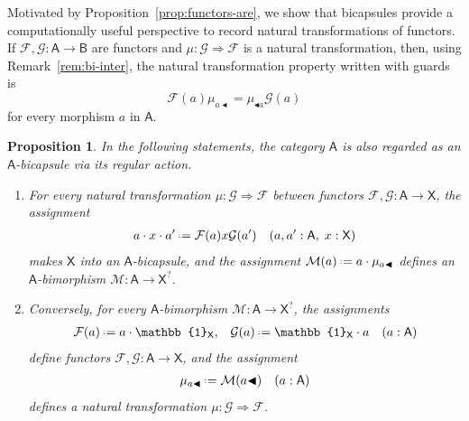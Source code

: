 \documentclass{amsart}
\newcommand{\Cat}[1]{\mathsf{#1}}
\newcommand{\cat}[1]{\Cat{#1}}
\newcommand{\acat}[1]{\mathsf{#1}}
\newcommand{\Caps}[1]{\mathsf{#1}}
\numberwithin{lstfloat}{section}
\newcommand{\srcfunc}{\mathbin{\blacktriangleleft}}
\newcommand{\tgtfunc}{\mathbin{\blacktriangleleft}}
\newcommand{\src}[1]{#1\srcfunc}
\newcommand{\tgt}[1]{\tgtfunc #1}
\newcommand{\one}{\mathbb{1}}
\newcommand{\defeq}{\mathrel{\hstretch{.13}{=}\hspace{.2ex}{=}}}
\newcommand{\func}[1]{\mathcal{#1}}
\newcommand{\fF}{\func{F}}
\newcommand{\fG}{\func{G}}
\newcommand{\fM}{\func{M}}
\newcommand{\cA}{\cat{A}}
\newcommand{\cX}{\cat{X}}
\newcommand{\aA}{\Caps{A}}
\newcommand{\aX}{\Caps{X}}
\newenvironment{ithm}{\begin{enumerate}[label={\rm(\alph*)}, ref=(\alph*),
      labelwidth=18pt, leftmargin=18pt, topsep=3pt, itemsep=1pt, parsep=2pt]}
      {\end{enumerate}}
\newtheorem{prop}[thm]{Proposition}
\theoremstyle{definition}
\theoremstyle{remark}
\numberwithin{equation}{section}
\begin{document}
Motivated by Proposition~\ref{prop:functors-are}, we show that bicapsules
provide a computationally useful perspective to record natural transformations
of functors. If $\func{F},\func{G}:\acat{A}\to\acat{B}$ are functors and $\mu:
\func{G}\Rightarrow \func{F}$ is a natural transformation, then, using
Remark~\ref{rem:bi-inter}, the natural transformation property written with guards is 
\[
  \func{F}(a)\mu_{\src{a}} = \mu_{\tgt{a}}\func{G}(a)
\]
for every morphism $a$ in $\acat{A}$.

\enlargethispage{0.6cm}

\begin{prop}
  \label{prop:nat-trans-biact}
  In the following statements, the category $\cA$ is 
  also regarded as an $\cA$-bicapsule via its 
  regular action.
  \begin{ithm}
  \item\label{proppart:get-biactions}
  For every natural transformation 
  $\mu:\fG\Rightarrow \fF$ between 
  functors $\fF,\fG:\cA\to \cX$, the assignment 
  \begin{align*}
  a\cdot x\cdot a'  \defeq \fF(a)x\fG(a') &&
  (a,a':\cA,\;x:\cX)
  \end{align*}
  makes $\acat{X}$ into an $\cA$-bicapsule, and 
  the assignment
  $\fM(a) \defeq a\cdot \mu_{\src{a}}$ defines an 
  $\cA$-bimorphism $\fM:\aA\to \aX^?$.

  \item\label{proppart:get-nat-trans}
  Conversely, for every $\cA$-bimorphism $\fM:\aA\to \aX^?$,
  the assignments 
  \begin{align*}
    \fF(a) & \defeq a\cdot \one_{\cX}, 
    & 
    \fG(a) & \defeq \one_{\cX}\cdot a
    &
    (a:\cA)
  \end{align*}
   define functors $\func{F},\func{G} : \cA\to \cX$, and
   the assignment
   \begin{align*} 
    \mu_{\src{a}} & \defeq \fM(\src{a}) & (a:\cA)
   \end{align*}
defines a natural transformation $\mu:\fG\Rightarrow \fF$. 
  \end{ithm}
\end{prop}
\end{document}
